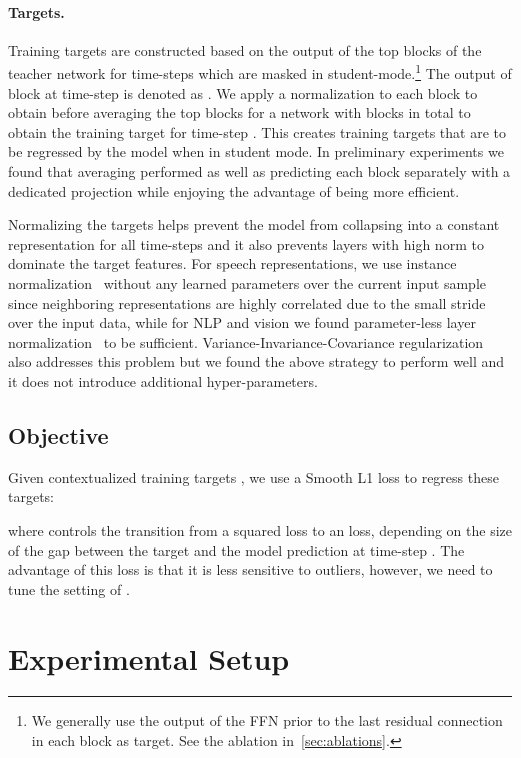 \documentclass[nohyperref]{article}
\theoremstyle{plain}
\theoremstyle{definition}
\theoremstyle{remark}
\begin{document}
\paragraph{Targets.}
Training targets are constructed based on the output of the top  blocks of the teacher network for time-steps which are masked in student-mode.\footnote{
We generally use the output of the FFN prior to the last residual connection in each block as target.
See the ablation in~\textsection\ref{sec:ablations}.
}
The output of block  at time-step  is denoted as . 
We apply a normalization to each block to obtain  before averaging the top  blocks  for a network with  blocks in total to obtain the training target  for time-step .
This creates training targets that are to be regressed by the model when in student mode.
In preliminary experiments we found that averaging performed as well as predicting each block separately with a dedicated projection while enjoying the advantage of being more efficient.

Normalizing the targets helps prevent the model from collapsing into a constant representation for all time-steps and it also prevents layers with high norm to dominate the target features.
For speech representations, we use instance normalization~\citep{ulyanov2016in} without any learned parameters over the current input sample since neighboring representations are highly correlated due to the small stride over the input data, while for NLP and vision we found parameter-less layer normalization~\citep{ba2016layer} to be sufficient.
Variance-Invariance-Covariance regularization~\citep{bardes2021vicreg} also addresses this problem but we found the above strategy to perform well and it  does not introduce additional hyper-parameters.




\subsection{Objective}

Given contextualized training targets , we use a Smooth L1 loss to regress these targets:

where  controls the transition from a squared loss to an  loss, depending on the size of the gap between the target  and the model prediction  at time-step . 
The advantage of this loss is that it is less sensitive to outliers, however, we need to tune the setting of . 




\section{Experimental Setup}
\label{sec:setup}
\end{document}
